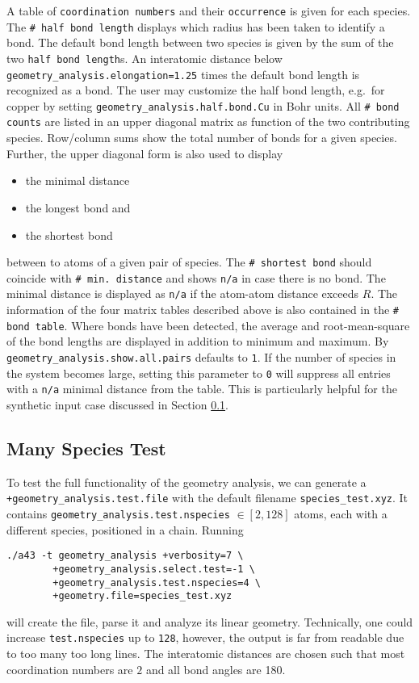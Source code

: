 \documentclass[oribibl]{llncs}
\newcommand{\ttt}[1]{\texttt{#1}}
\begin{document}
A table of \ttt{coordination numbers} and their \ttt{occurrence} is given for each species.
The \ttt{\# half bond length} displays which radius has been taken to identify a bond.
The default bond length between two species is given by the sum of
the two \ttt{half bond length}s.
An interatomic distance below \ttt{geometry\_analysis.elongation=1.25} 
times the default bond length is recognized as a bond.
%
The user may customize the half bond length, e.g.~for copper 
by setting \ttt{geometry\_analysis.half.bond.Cu} in Bohr units.
%
All \ttt{\# bond counts} are listed in an upper diagonal matrix as function of the two
contributing species. Row/column sums show the total number of bonds for a given species.
Further, the upper diagonal form is also used to display
\begin{itemize}
	\item the minimal distance
	\item the longest bond and
	\item the shortest bond
\end{itemize}
between to atoms of a given pair of species.
The \ttt{\# shortest bond} should coincide with \ttt{\# min. distance}
and shows \ttt{n/a} in case there is no bond.
The minimal distance is displayed as \ttt{n/a} if the atom-atom distance exceeds $R$.
%
The information of the four matrix tables described above
is also contained in the \ttt{\# bond table}.
Where bonds have been detected, 
the average and root-mean-square of the bond lengths are displayed
in addition to minimum and maximum.
By \ttt{geometry\_analysis.show.all.pairs} defaults to \ttt{1}.
If the number of species in the system becomes large, setting this
parameter to \ttt{0} will suppress all entries with a \ttt{n/a} minimal distance from the table.
This is particularly helpful for the synthetic input case discussed in Section \ref{sec:many-species-test}.

%
%
\subsection{Many Species Test} \label{sec:many-species-test}
%
To test the full functionality of the geometry analysis,
we can generate a \ttt{+geometry\_analysis.test.file} 
with the default filename \ttt{species\_test.xyz}.
It contains \ttt{geometry\_analysis.test.nspecies} $\in [2, 128]$ atoms, each with a
different species, positioned in a chain. Running
\begin{verbatim}
./a43 -t geometry_analysis +verbosity=7 \
        +geometry_analysis.select.test=-1 \
        +geometry_analysis.test.nspecies=4 \
        +geometry.file=species_test.xyz
\end{verbatim}
will create the file, parse it and analyze its linear geometry.
Technically, one could increase \ttt{test.nspecies} up to \ttt{128},
however, the output is far from readable due to too many too long lines.
The interatomic distances are chosen such that most coordination numbers
are $2$ and all bond angles are 180\degree{}.
%
\end{document}
